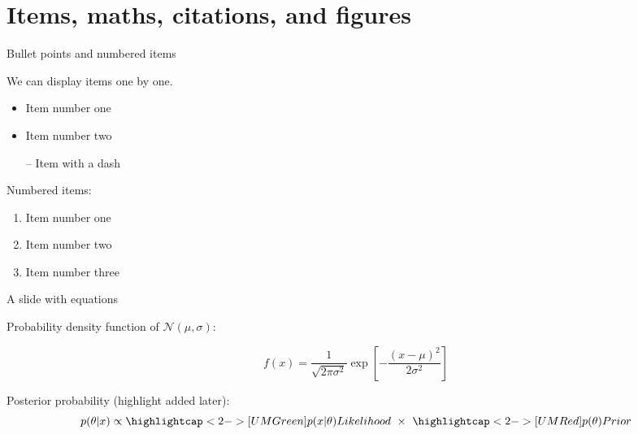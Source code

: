 \documentclass[12pt]{beamer}
\begin{document}

\section{Items, maths, citations, and figures}

\begin{frame}{Bullet points and numbered items}

We can display items \alert{one by one}.

\pause

\begin{itemize}[<+->]
    \item Item \alert<2>{number one}
    \item Item \alert<3>{number two}
    \item[--] Item with a \alert<4>{dash}
\end{itemize}

\pause
Numbered items:

\begin{enumerate}[<+->]
    \item Item \alert<6>{number one}
    \item Item \alert<7>{number two}
    \item Item \alert<8>{number three}
\end{enumerate}
\end{frame}



\begin{frame}{A slide with {\color{UMYellow} equations}}

Probability density function of $\mathcal{N}(\mu, \sigma)$:

\begin{equation*}
f(x) = \frac{1}{\sqrt{2\pi\sigma^2}} \exp \left[ - \frac{(x-\mu)^2}{2\sigma^2} \right]
\end{equation*}

\bigskip

Posterior probability (highlight added later):
\begin{equation*}
p(\theta | x) \propto 
	\highlightcap<2->[UMGreen]{p(x | \theta)}{\footnotesize Likelihood}
	~\times~
	\highlightcap<2->[UMRed]{p(\theta)}{\footnotesize Prior}
\end{equation*}

\end{frame}
\end{document}
